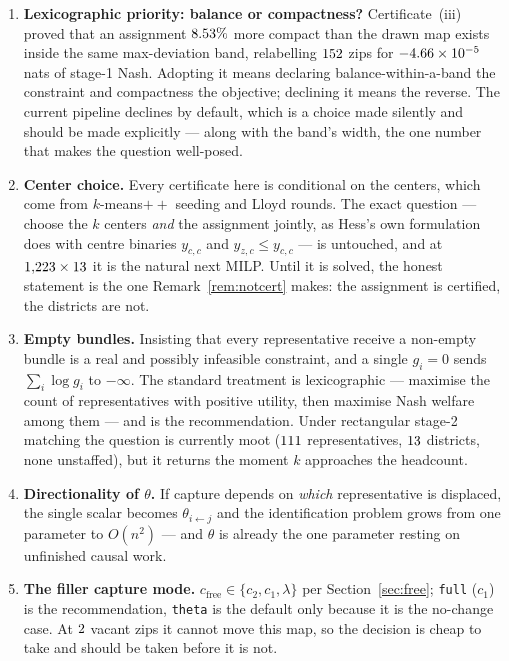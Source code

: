\documentclass[11pt]{article}
\theoremstyle{definition}
\newcommand{\cfree}{c_{\mathrm{free}}}
\begin{document}
\begin{enumerate}
\item \textbf{Lexicographic priority: balance or compactness?} Certificate~(iii) proved that
an assignment $8.53\%$ more compact than the drawn map exists inside the same
max-deviation band, relabelling $152$ zips for $-4.66\times10^{-5}$ nats of stage-1
Nash. Adopting it means declaring balance-within-a-band the constraint and compactness the
objective; declining it means the reverse. The current pipeline declines by default, which
is a choice made silently and should be made explicitly --- along with the band's width, the
one number that makes the question well-posed.
\item \textbf{Center choice.} Every certificate here is conditional on the centers, which
come from $k$-means$++$ seeding and Lloyd rounds. The exact question --- choose the $k$
centers \emph{and} the assignment jointly, as Hess's own formulation does with centre
binaries $y_{c,c}$ and $y_{z,c}\le y_{c,c}$ --- is untouched, and at
$1{,}223\times13$ it is the natural next MILP. Until it is solved, the honest
statement is the one Remark~\ref{rem:notcert} makes: the assignment is certified, the
districts are not.
\item \textbf{Empty bundles.} Insisting that every representative receive a non-empty
bundle is a real and possibly infeasible constraint, and a single $g_i=0$ sends
$\sum_i\log g_i$ to $-\infty$. The standard treatment is lexicographic --- maximise the
count of representatives with positive utility, then maximise Nash welfare among them
\citep{caragiannis2019} --- and is the recommendation. Under rectangular stage-2 matching
the question is currently moot ($111$ representatives, $13$ districts, none
unstaffed), but it returns the moment $k$ approaches the headcount.
\item \textbf{Directionality of $\theta$.} If capture depends on \emph{which}
representative is displaced, the single scalar becomes $\theta_{i\leftarrow j}$ and the
identification problem grows from one parameter to $O(n^2)$ --- and $\theta$ is already the
one parameter resting on unfinished causal work.
\item \textbf{The filler capture mode.} $\cfree\in\{c_2,c_1,\lambda\}$ per
Section~\ref{sec:free}; \texttt{full} ($c_1$) is the recommendation, \texttt{theta} is the
default only because it is the no-change case. At $2$ vacant zips it cannot move
this map, so the decision is cheap to take and should be taken before it is not.

\end{enumerate}
\end{document}
